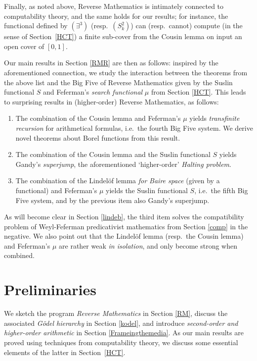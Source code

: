 \documentclass[reqno]{amsart}
\numberwithin{equation}{section}
\numberwithin{thm}{section}
\begin{document}
\smallskip

Finally, as noted above, Reverse Mathematics is intimately connected to computability theory, and the same holds for our results;
for instance, the functional defined by $(\exists^{3})$ (resp.\ $(S_{k}^{2})$) can (resp.\ cannot) compute (in the sense of Section~\ref{HCT}) a finite sub-cover from the Cousin lemma on input an open cover of $[0,1]$.  

\smallskip
    
Our main results in Section \ref{RMR} are then as follows: inspired by the aforementioned connection, 
we study the interaction between the theorems from the above list and the Big Five of Reverse Mathematics given by the Suslin functional $S$ and Feferman's \emph{search functional} $\mu$ from Section \ref{HCT}.  
This leads to surprising results in (higher-order) Reverse Mathematics, as follows:
\begin{enumerate}
\item The combination of the Cousin lemma and Feferman's $\mu$ yields \emph{transfinite recursion} for arithmetical formulas, i.e.\ the fourth Big Five system.  
We derive novel theorems about Borel functions from this result.    
\item The combination of the Cousin lemma and the Suslin functional $S$ yields Gandy's \emph{superjump}, the aforementioned `higher-order' \emph{Halting problem}.
\item The combination of the Lindel\"of lemma \emph{for Baire space} (given by a functional) and Feferman's $\mu$ yields the Suslin functional $S$, i.e.\ the fifth Big Five system, and by the previous item also Gandy's superjump.  
\end{enumerate}
As will become clear in Section \ref{lindeb}, the third item solves the compatibility problem of Weyl-Feferman predicativist mathematics from Section \ref{comp} in the negative.  
We also point out that the Lindel\"of lemma (resp.\ the Cousin lemma) and Feferman's $\mu$ are rather weak \emph{in isolation}, and only become strong when combined.  

\section{Preliminaries}\label{preli}
We sketch the program \emph{Reverse Mathematics} in Section \ref{RM}, discuss the associated \emph{G\"odel hierarchy} in Section \ref{kodel}, and introduce \emph{second-order and higher-order arithmetic} in Section \ref{Frameingthemedia}.  As our main results are proved using techniques from computability theory, we discuss some essential elements of the latter in Section~\ref{HCT}.
\end{document}
